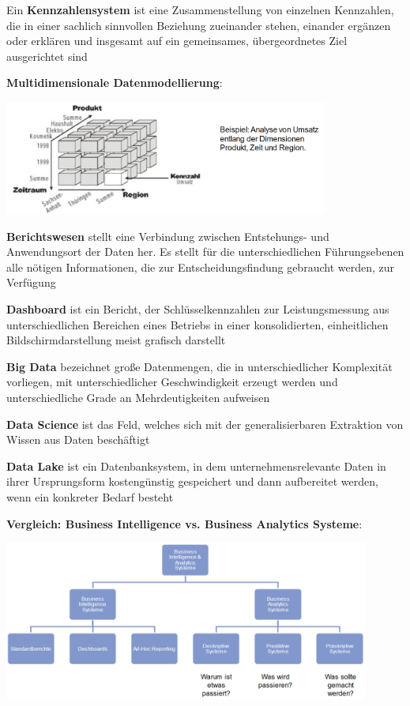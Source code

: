 Ein \textbf{Kennzahlensystem} ist eine Zusammenstellung von einzelnen Kennzahlen, die in einer sachlich sinnvollen Beziehung zueinander stehen, einander ergänzen oder erklären und insgesamt auf ein gemeinsames, übergeordnetes Ziel ausgerichtet sind

\textbf{Multidimensionale Datenmodellierung}: 
\begin{center}
	\includegraphics[width=0.8\textwidth]{images/mdd.png}
\end{center}

\textbf{Berichtswesen} stellt eine Verbindung zwischen Entstehungs- und Anwendungsort der Daten her. Es stellt für die unterschiedlichen Führungsebenen alle nötigen Informationen, die zur Entscheidungsfindung gebraucht werden, zur Verfügung

\textbf{Dashboard} ist ein Bericht, der Schlüsselkennzahlen zur Leistungsmessung aus unterschiedlichen Bereichen
eines Betriebs in einer konsolidierten, einheitlichen Bildschirmdarstellung meist grafisch darstellt 

\textbf{Big Data} bezeichnet große Datenmengen, die in unterschiedlicher Komplexität vorliegen, mit unterschiedlicher Geschwindigkeit erzeugt werden und unterschiedliche Grade an Mehrdeutigkeiten aufweisen

\textbf{Data Science} ist das Feld, welches sich mit der generalisierbaren Extraktion von Wissen aus Daten beschäftigt

\textbf{Data Lake} ist ein Datenbanksystem, in dem unternehmensrelevante Daten in ihrer Ursprungsform kostengünstig gespeichert und dann aufbereitet werden, wenn ein konkreter Bedarf besteht

\textbf{Vergleich: Business Intelligence vs. Business Analytics Systeme}:
\begin{center}
	\includegraphics[width=0.9\textwidth]{images/bibas.png}
\end{center}


